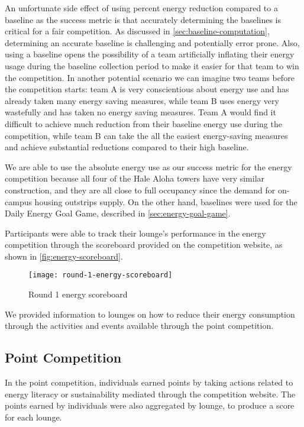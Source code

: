 An unfortunate side effect of using percent energy reduction compared to a baseline as the success metric is that accurately determining the baselines is critical for a fair competition. As discussed in \autoref{sec:baseline-computation}, determining an accurate baseline is challenging and potentially error prone. Also, using a baseline opens the possibility of a team artificially inflating their energy usage during the baseline collection period to make it easier for that team to win the competition. In another potential scenario we can imagine two teams before the competition starts: team A is very conscientious about energy use and has already taken many energy saving measures, while team B uses energy very wastefully and has taken no energy saving measures. Team A would find it difficult to achieve much reduction from their baseline energy use during the competition, while team B can take the all the easiest energy-saving measures and achieve substantial reductions compared to their high baseline.

We are able to use the absolute energy use as our success metric for the energy competition because all four of the Hale Aloha towers have very similar construction, and they are all close to full occupancy since the demand for on-campus housing outstrips supply. On the other hand, baselines were used for the Daily Energy Goal Game, described in \autoref{sec:energy-goal-game}.

Participants were able to track their lounge's performance in the energy competition through the scoreboard provided on the competition website, as shown in \autoref{fig:energy-scoreboard}.

\begin{figure}[htbp]
	\centering
		\texttt{[image: round-1-energy-scoreboard]}
		\caption{Round 1 energy scoreboard}
\label{fig:energy-scoreboard}
\end{figure}

We provided information to lounges on how to reduce their energy consumption through the activities and events available through the point competition.


\subsection{Point Competition}
\label{sec:point-competition}

In the point competition, individuals earned points by taking actions related to energy literacy or sustainability mediated through the competition website. The points earned by individuals were also aggregated by lounge, to produce a score for each lounge.

